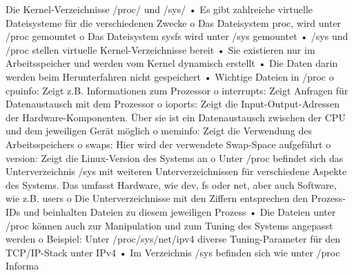 Die Kernel-Verzeichnisse /proc/ und /sys/
• Es gibt zahlreiche virtuelle Dateisysteme für die verschiedenen Zwecke
o Das Dateisystem proc, wird unter /proc gemountet
o Das Dateisystem sysfs wird unter /sys gemountet
• /sys und /proc stellen virtuelle Kernel-Verzeichnisse bereit
• Sie existieren nur im Arbeitsspeicher und werden vom Kernel dynamisch erstellt
• Die Daten darin werden beim Herunterfahren nicht gespeichert
• Wichtige Dateien in /proc
o cpuinfo: Zeigt z.B. Informationen zum Prozessor
o interrupts: Zeigt Anfragen für Datenaustausch mit dem Prozessor
o ioports: Zeigt die Input-Output-Adressen der Hardware-Komponenten. Über sie ist
ein Datenaustausch zwischen der CPU und dem jeweiligen Gerät möglich
o meminfo: Zeigt die Verwendung des Arbeitsspeichers
o swaps: Hier wird der verwendete Swap-Space aufgeführt
o version: Zeigt die Linux-Version des Systems an
o Unter /proc befindet sich das Unterverzeichnis /sys mit weiteren
Unterverzeichnissen für verschiedene Aspekte des Systems. Das umfasst Hardware,
wie dev, fs oder net, aber auch Software, wie z.B. users
o Die Unterverzeichnisse mit den Ziffern entsprechen den Prozess-IDs und beinhalten
Dateien zu diesem jeweiligen Prozess
• Die Dateien unter /proc können auch zur Manipulation und zum Tuning des Systems
angepasst werden
o Beispiel: Unter /proc/sys/net/ipv4 diverse Tuning-Parameter für den TCP/IP-Stack
unter IPv4
• Im Verzeichnis /sys befinden sich wie unter /proc Informa













